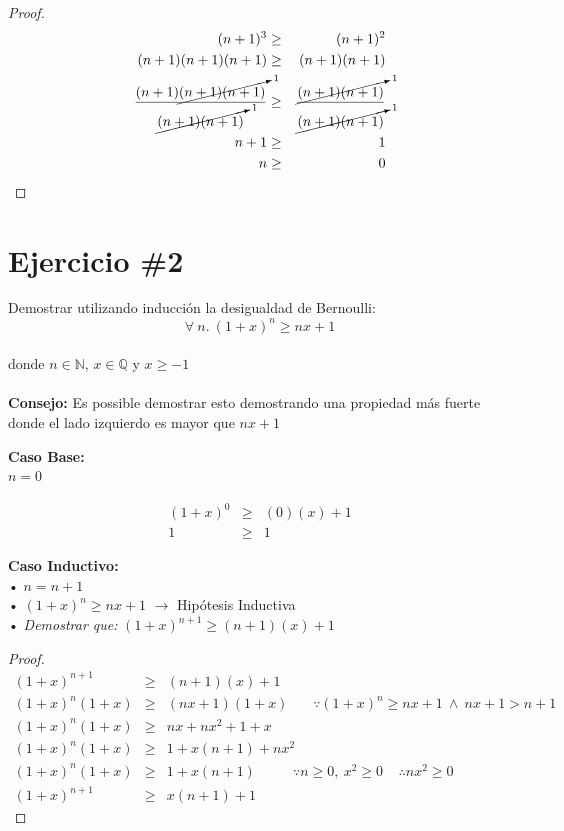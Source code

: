 \documentclass[11pt,letterpaper]{article}
\begin{document}
\begin{proof}

\begin{eqnarray*}
(n+1)^3&\geq&(n+1)^2\\
(n+1)(n+1)(n+1)&\geq&(n+1)(n+1)\\
\frac{(n+1)\cancelto{1}{(n+1)(n+1)}}{\cancelto{1}{(n+1)(n+1)}}&\geq&\frac{\cancelto{1}{(n+1)(n+1)}}{\cancelto{1}{(n+1)(n+1)}} \\
n+1&\geq& 1\\
n&\geq& 0
\end{eqnarray*}

\end{proof}


\section*{\Large Ejercicio \#2}
\noindent Demostrar utilizando inducción la desigualdad de Bernoulli:
\[
        \forall\ n.\ (1+x)^n\geq nx+1
\]
\\donde $n\in \mathbb{N}$, $x\in \mathbb{Q}$ y $x\geq -1$
\\
\\{\bf Consejo: }Es possible demostrar esto demostrando una propiedad más fuerte
donde el lado izquierdo es mayor que $nx + 1$ \vspace{1cm}

\noindent \textbf{\large Caso Base:}\\
\noindent $n=0$

\begin{eqnarray*}
(1+x)^0 &\geq& (0)(x)+1 \\
1 &\geq& 1
\end{eqnarray*}

\vspace{0.1cm}

\noindent \textbf{\large Caso Inductivo:}\\
\noindent • $n=n+1$ \\
\noindent • $(1+x)^n \geq nx+1$ $\rightarrow$ Hipótesis Inductiva \\
\noindent • \emph{Demostrar que:} $(1+x)^{n+1} \geq (n+1)(x)+1$ \\

\begin{proof}

\begin{eqnarray*}
(1+x)^{n+1} &\geq& (n+1)(x)+1 \\
(1+x)^n(1+x)&\geq&(nx+1)(1+x) \ \ \ \ \ \ \ \ \because(1+x)^n \geq nx+1 \ \wedge \ nx+1>n+1 \\ 
(1+x)^n(1+x)&\geq& nx+nx^2+1+x \\
(1+x)^n(1+x)&\geq& 1+x(n+1)+nx^2 \\
(1+x)^n(1+x)&\geq& 1+x(n+1) \ \ \ \ \ \ \ \ \ \ \ \ \because n \geq 0, \ x^2 \geq 0 \ \ \ \ \ \therefore nx^2 \geq 0 \\
(1+x)^{n+1}&\geq& x(n+1)+1
\end{eqnarray*}

\end{proof}
\end{document}

